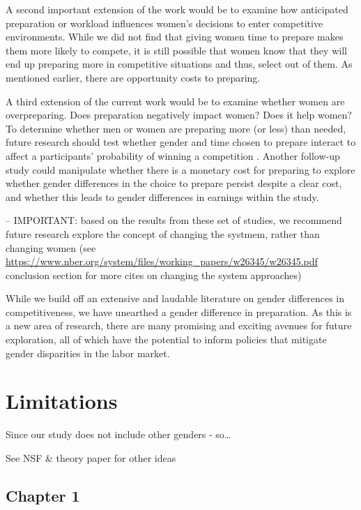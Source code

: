 \documentclass[a4paper, nobind]{templates/ociamthesis}
\begin{document}
A second important extension of the work would be to examine how anticipated preparation or workload influences women's decisions to enter competitive environments. While we did not find that giving women time to prepare makes them more likely to compete, it is still possible that women know that they will end up preparing more in competitive situations and thus, select out of them. As mentioned earlier, there are opportunity costs to preparing.

A third extension of the current work would be to examine whether women are overpreparing. Does preparation negatively impact women? Does it help women? To determine whether men or women are preparing more (or less) than needed, future research should test whether gender and time chosen to prepare interact to affect a participants' probability of winning a competition \autocite[see][]{Niederle2007}. Another follow-up study could manipulate whether there is a monetary cost for preparing to explore whether gender differences in the choice to prepare persist despite a clear cost, and whether this leads to gender differences in earnings within the study.

-- IMPORTANT: based on the results from these set of studies, we recommend future research explore the concept of changing the systmem, rather than changing women (see \url{https://www.nber.org/system/files/working_papers/w26345/w26345.pdf} conclusion section for more cites on changing the system approaches)

While we build off an extensive and laudable literature on gender differences in competitiveness, we have unearthed a gender difference in preparation. As this is a new area of research, there are many promising and exciting avenues for future exploration, all of which have the potential to inform policies that mitigate gender disparities in the labor market.

\hypertarget{limitations}{%
\chapter{Limitations}\label{limitations}}

Since our study does not include other genders - so\ldots{}

See NSF \& theory paper for other ideas

\startappendices

\hypertarget{chapter-1}{%
\section{Chapter 1}\label{chapter-1}}
\end{document}
